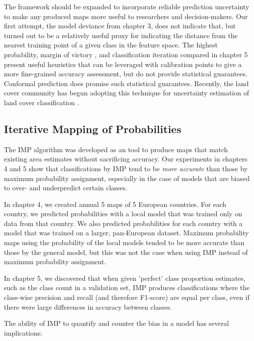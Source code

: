         The framework should be expanded to incorporate reliable prediction uncertainty to make any produced maps more useful to researchers and decision-makers. Our first attempt, the model deviance from chapter 3, does not indicate that, but turned out to be a relatively useful proxy for indicating the distance from the nearest training point of a given class in the feature space. The highest probability, margin of victory \citep{calderon-loor2021high}, and classification iteration compared in chapter 5 present useful heuristics that can be leveraged with calibration points to give a more fine-grained accuracy assessment, but do not provide statistical guarantees. Conformal prediction \citep{angelopoulos2023predictionpowered} does promise such statistical guarantees. Recently, the land cover community has begun adopting this technique for uncertainty estimation of land cover classification \citep{valle2023quantifying, singh2024uncertainty}.
    
    \subsection{Iterative Mapping of Probabilities}

        The IMP algorithm was developed as an tool to produce maps that match existing area estimates without sacrificing accuracy. Our experiments in chapters 4 and 5 show that classifications by IMP tend to be \textit{more accurate} than those by maximum probability assignment, especially in the case of models that are biased to over- and underpredict certain classes. 
        
        In chapter 4, we created annual 5 maps of 5 European countries. For each country, we predicted probabilities with a local model that was trained only on data from that country. We also predicted probabilities for each country with a model that was trained on a larger, pan-European dataset. Maximum probability maps using the probability of the local models tended to be more accurate than those by the general model, but this was not the case when using IMP instead of maximum probability assignment.

        In chapter 5, we discovered that when given 'perfect' class proportion estimates, such as the class count in a validation set, IMP produces classifications where the class-wise precision and recall (and therefore F1-score) are equal per class, even if there were large differences in accuracy between classes.

        The ability of IMP to quantify and counter the bias in a model has several implications: 
        
